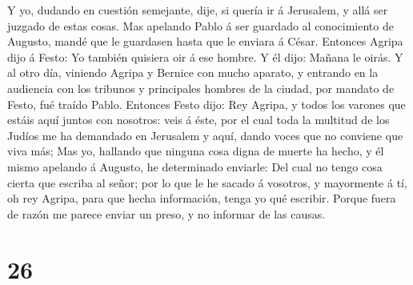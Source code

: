  Y yo, dudando en cuestión semejante, dije, si quería ir á
Jerusalem, y allá ser juzgado de estas cosas.  Mas apelando
Pablo á ser guardado al conocimiento de Augusto, mandé que le guardasen
hasta que le enviara á César.  Entonces Agripa dijo á
Festo: Yo también quisiera oir á ese hombre. Y él dijo: Mañana le oirás.
 Y al otro día, viniendo Agripa y Bernice con mucho
aparato, y entrando en la audiencia con los tribunos y principales
hombres de la ciudad, por mandato de Festo, fué traído Pablo.
 Entonces Festo dijo: Rey Agripa, y todos los varones que
estáis aquí juntos con nosotros: veis á éste, por el cual toda la
multitud de los Judíos me ha demandado en Jerusalem y aquí, dando voces
que no conviene que viva más;  Mas yo, hallando que ninguna
cosa digna de muerte ha hecho, y él mismo apelando á Augusto, he
determinado enviarle:  Del cual no tengo cosa cierta que
escriba al señor; por lo que le he sacado á vosotros, y mayormente á tí,
oh rey Agripa, para que hecha información, tenga yo qué escribir.
 Porque fuera de razón me parece enviar un preso, y no
informar de las causas.

\hypertarget{section-25}{%
\section{26}\label{section-25}}

